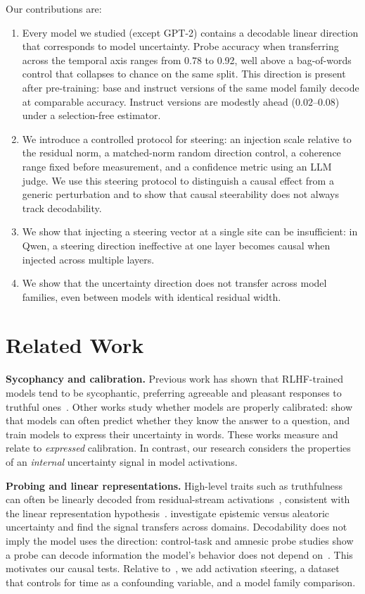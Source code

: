 \documentclass{article}
\begin{document}
Our contributions are:
\begin{enumerate}
    \item Every model we studied (except GPT-2) contains a decodable linear direction that corresponds to model uncertainty. Probe accuracy when transferring across the temporal axis ranges from 0.78 to 0.92, well above a bag-of-words control that collapses to chance on the same split. This direction is present after pre-training: base and instruct versions of the same model family decode at comparable accuracy. Instruct versions are modestly ahead ($0.02$--$0.08$) under a selection-free estimator.
    \item We introduce a controlled protocol for steering: an injection scale relative to the residual norm, a matched-norm random direction control, a coherence range fixed before measurement, and a confidence metric using an LLM judge. We use this steering protocol to distinguish a causal effect from a generic perturbation and to show that causal steerability does not always track decodability.
    \item We show that injecting a steering vector at a single site can be insufficient: in Qwen, a steering direction ineffective at one layer becomes causal when injected across multiple layers.
    \item We show that the uncertainty direction does not transfer across model families, even between models with identical residual width.
\end{enumerate}

\section{Related Work}

\textbf{Sycophancy and calibration.} Previous work has shown that RLHF-trained models tend to be sycophantic, preferring agreeable and pleasant responses to truthful ones~\citep{sharma2023sycophancy}. Other works study whether models are properly calibrated: \citet{kadavath2022know} show that models can often predict whether they know the answer to a question, and \citet{lin2022teaching} train models to express their uncertainty in words. These works measure and relate to \emph{expressed} calibration. In contrast, our research considers the properties of an \emph{internal} uncertainty signal in model activations.

\textbf{Probing and linear representations.} High-level traits such as truthfulness can often be linearly decoded from residual-stream activations~\citep{azaria2023internal, burns2022discovering, marks2023geometry}, consistent with the linear representation hypothesis~\citep{park2023linear}. \citet{ahdritz2024distinguishing} investigate epistemic versus aleatoric uncertainty and find the signal transfers across domains. Decodability does not imply the model uses the direction: control-task and amnesic probe studies show a probe can decode information the model's behavior does not depend on~\citep{hewitt2019designing, elazar2021amnesic}. This motivates our causal tests. Relative to~\citet{ahdritz2024distinguishing}, we add activation steering, a dataset that controls for time as a confounding variable, and a model family comparison.
\end{document}
